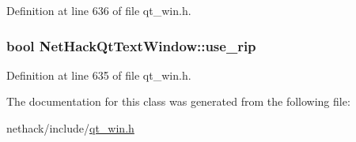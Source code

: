 Definition at line 636 of file qt\+\_\+win.\+h.

\hypertarget{classNetHackQtTextWindow_af775fd368d1a1e26c2655f850d3b049c}{
\subsubsection[{use\+\_\+rip}]{\setlength{\rightskip}{0pt plus 5cm}bool Net\+Hack\+Qt\+Text\+Window\+::use\+\_\+rip\hspace{0.3cm}{\ttfamily [private]}}}\label{classNetHackQtTextWindow_af775fd368d1a1e26c2655f850d3b049c}


Definition at line 635 of file qt\+\_\+win.\+h.



The documentation for this class was generated from the following file\+:\begin{DoxyCompactItemize}
\item 
nethack/include/\hyperlink{qt__win_8h}{qt\+\_\+win.\+h}\end{DoxyCompactItemize}
